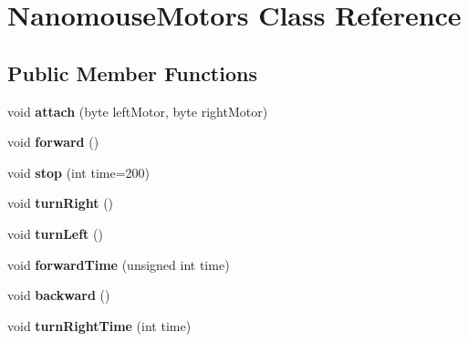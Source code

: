 \hypertarget{class_nanomouse_motors}{}\section{Nanomouse\+Motors Class Reference}
\label{class_nanomouse_motors}
\subsection*{Public Member Functions}
\begin{DoxyCompactItemize}
\item 
\hypertarget{class_nanomouse_motors_ac1562f54745829f6f061c3f8ece2c8b3}{}void {\bfseries attach} (byte left\+Motor, byte right\+Motor)\label{class_nanomouse_motors_ac1562f54745829f6f061c3f8ece2c8b3}

\item 
\hypertarget{class_nanomouse_motors_aa60148400f6acb163e1e0129f4768449}{}void {\bfseries forward} ()\label{class_nanomouse_motors_aa60148400f6acb163e1e0129f4768449}

\item 
\hypertarget{class_nanomouse_motors_a5d306f306bf6fb42e1a6768ebba8ff79}{}void {\bfseries stop} (int time=200)\label{class_nanomouse_motors_a5d306f306bf6fb42e1a6768ebba8ff79}

\item 
\hypertarget{class_nanomouse_motors_a566deca1ae943c4400832901d07b66af}{}void {\bfseries turn\+Right} ()\label{class_nanomouse_motors_a566deca1ae943c4400832901d07b66af}

\item 
\hypertarget{class_nanomouse_motors_a7eaeb69765211219d7469cd5756e3f0e}{}void {\bfseries turn\+Left} ()\label{class_nanomouse_motors_a7eaeb69765211219d7469cd5756e3f0e}

\item 
\hypertarget{class_nanomouse_motors_a77b3b758063b90f8f33dc007c2e9c7e0}{}void {\bfseries forward\+Time} (unsigned int time)\label{class_nanomouse_motors_a77b3b758063b90f8f33dc007c2e9c7e0}

\item 
\hypertarget{class_nanomouse_motors_a75e19df9244df17b626f1c6b02234b5a}{}void {\bfseries backward} ()\label{class_nanomouse_motors_a75e19df9244df17b626f1c6b02234b5a}

\item 
\hypertarget{class_nanomouse_motors_a099b01ee4f457de78635d3b7f7a7a2bf}{}void {\bfseries turn\+Right\+Time} (int time)\label{class_nanomouse_motors_a099b01ee4f457de78635d3b7f7a7a2bf}


\end{DoxyCompactItemize}
